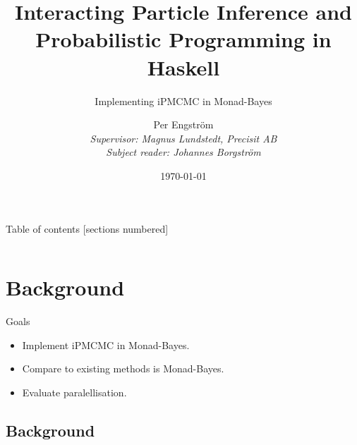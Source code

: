 \documentclass[usenames,dvipsnames,10pt]{beamer}
\subtitle{Implementing iPMCMC in Monad-Bayes}
\title{Interacting Particle Inference and Probabilistic Programming in Haskell}
\date{\today}
\author{Per Engström \\ \footnotesize\em Supervisor: Magnus Lundstedt, Precisit AB \\ Subject reader: Johannes Borgström}
\institute{Uppsala University}
\begin{document}
\maketitle

\begin{frame}{Table of contents}
  [sections numbered]
  \begin{columns}
      \begin{column}{0.5\textwidth}
  \tableofcontents[hideallsubsections,sections={1-4}]
      \end{column}
      \begin{column}{0.5\textwidth}
  \tableofcontents[hideallsubsections,sections={5-7}]
      \end{column}
  \end{columns}

\end{frame}

\section{Background}

\begin{frame}{Goals}
    \begin{itemize}
\item Implement iPMCMC in Monad-Bayes.

\item Compare to existing methods is Monad-Bayes.

\item Evaluate paralellisation.
\end{itemize}
\end{frame}

\subsection{Background}
\label{sub:background}
\end{document}
